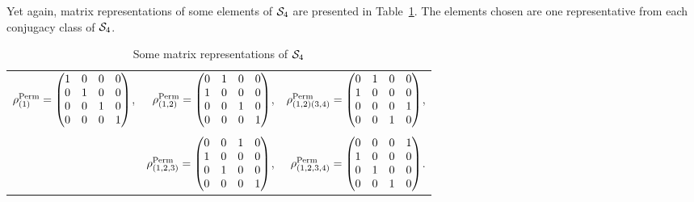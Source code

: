	\begin{example}
		Yet again, matrix representations of some elements of $\mathcal{S}_4$ are presented in Table~\ref{table:permS4}. The elements chosen are one representative from each conjugacy class of $\mathcal{S}_4$.
		\begin{table}[hbt!]
			\centering
			\begin{tabular}{r r r}
				$\rho_{(1)}^{\text{Perm}} = \left(\begin{matrix}
					1 & 0 & 0 & 0 \\
					0 & 1 & 0 & 0 \\
					0 & 0 & 1 & 0 \\
					0 & 0 & 0 & 1
				\end{matrix}\right)$,  &
				$\rho_{(1,2)}^{\text{Perm}} = \left(\begin{matrix}
					0 & 1 & 0 & 0 \\
					1 & 0 & 0 & 0 \\
					0 & 0 & 1 & 0 \\
					0 & 0 & 0 & 1
				\end{matrix}\right)$, &
				$\rho_{(1,2)(3,4)}^{\text{Perm}} = \left(\begin{matrix}
					0 & 1 & 0 & 0 \\
					1 & 0 & 0 & 0 \\
					0 & 0 & 0 & 1 \\
					0 & 0 & 1 & 0
				\end{matrix}\right)$, \\ & & \\ &
				$\rho_{(1,2,3)}^{\text{Perm}} = \left(\begin{matrix}
					0 & 0 & 1 & 0 \\
					1 & 0 & 0 & 0 \\
					0 & 1 & 0 & 0 \\
					0 & 0 & 0 & 1
				\end{matrix}\right)$, &
				$\rho_{(1,2,3,4)}^{\text{Perm}} = \left(\begin{matrix}
					0 & 0 & 0 & 1 \\
					1 & 0 & 0 & 0 \\
					0 & 1 & 0 & 0 \\
					0 & 0 & 1 & 0
				\end{matrix}\right)$.
			\end{tabular}
			\caption{Some matrix representations of $\mathcal{S}_4$}
			\label{table:permS4}
		\end{table}
	\end{example}

